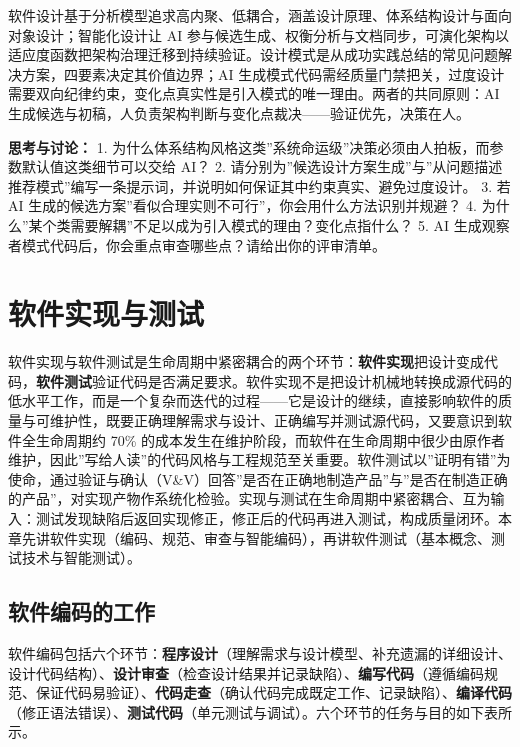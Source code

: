 \documentclass[
]{ctexbook}
\begin{document}
软件设计基于分析模型追求高内聚、低耦合，涵盖设计原理、体系结构设计与面向对象设计；智能化设计让
AI
参与候选生成、权衡分析与文档同步，可演化架构以适应度函数把架构治理迁移到持续验证。设计模式是从成功实践总结的常见问题解决方案，四要素决定其价值边界；AI
生成模式代码需经质量门禁把关，过度设计需要双向纪律约束，变化点真实性是引入模式的唯一理由。两者的共同原则：AI
生成候选与初稿，人负责架构判断与变化点裁决------验证优先，决策在人。

\textbf{思考与讨论：} 1.
为什么体系结构风格这类''系统命运级''决策必须由人拍板，而参数默认值这类细节可以交给
AI？ 2.
请分别为''候选设计方案生成''与''从问题描述推荐模式''编写一条提示词，并说明如何保证其中约束真实、避免过度设计。
3. 若 AI
生成的候选方案''看似合理实则不可行''，你会用什么方法识别并规避？ 4.
为什么''某个类需要解耦''不足以成为引入模式的理由？变化点指什么？ 5. AI
生成观察者模式代码后，你会重点审查哪些点？请给出你的评审清单。

\chapter{软件实现与测试}\label{ux8f6fux4ef6ux5b9eux73b0ux4e0eux6d4bux8bd5}

软件实现与软件测试是生命周期中紧密耦合的两个环节：\textbf{软件实现}把设计变成代码，\textbf{软件测试}验证代码是否满足要求。软件实现不是把设计机械地转换成源代码的低水平工作，而是一个复杂而迭代的过程------它是设计的继续，直接影响软件的质量与可维护性，既要正确理解需求与设计、正确编写并测试源代码，又要意识到软件全生命周期约
70\%
的成本发生在维护阶段，而软件在生命周期中很少由原作者维护，因此''写给人读''的代码风格与工程规范至关重要。软件测试以''证明有错''为使命，通过验证与确认（V\&V）回答''是否在正确地制造产品''与''是否在制造正确的产品''，对实现产物作系统化检验。实现与测试在生命周期中紧密耦合、互为输入：测试发现缺陷后返回实现修正，修正后的代码再进入测试，构成质量闭环。本章先讲软件实现（编码、规范、审查与智能编码），再讲软件测试（基本概念、测试技术与智能测试）。

\section{软件编码的工作}\label{ux8f6fux4ef6ux7f16ux7801ux7684ux5de5ux4f5c}

软件编码包括六个环节：\textbf{程序设计}（理解需求与设计模型、补充遗漏的详细设计、设计代码结构）、\textbf{设计审查}（检查设计结果并记录缺陷）、\textbf{编写代码}（遵循编码规范、保证代码易验证）、\textbf{代码走查}（确认代码完成既定工作、记录缺陷）、\textbf{编译代码}（修正语法错误）、\textbf{测试代码}（单元测试与调试）。六个环节的任务与目的如下表所示。
\end{document}
